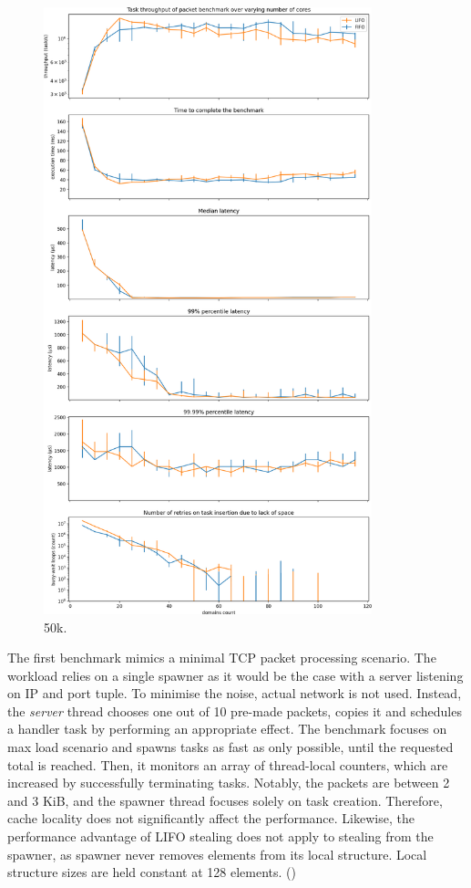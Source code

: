 \documentclass[12pt,a4paper,twoside]{report}
\begin{document}
\begin{figure}
     \centering
     \includegraphics[width=0.85\textwidth]{eval/packet-basic-with-steal-counts2std.png}
     \caption{50k.}
    \label{fig:packet-50k}
\end{figure}

The first benchmark mimics a minimal TCP packet processing scenario. The workload relies on a single spawner as it would be the case with a server listening on IP and port tuple. To minimise the noise, actual network is not used. Instead, the \textit{server} thread chooses one out of 10 pre-made packets, copies it and schedules a handler task by performing an appropriate effect. The benchmark focuses on max load scenario and spawns tasks as fast as only possible, until the requested total is reached. Then, it monitors an array of thread-local counters, which are increased by successfully terminating tasks. Notably, the packets are between 2 and 3 KiB, and the spawner thread focuses solely on task creation. Therefore, cache locality does not significantly affect the performance. Likewise, the performance advantage of LIFO stealing does not apply to stealing from the spawner, as spawner never removes elements from its local structure. Local structure sizes are held constant at 128 elements. ()
\end{document}

